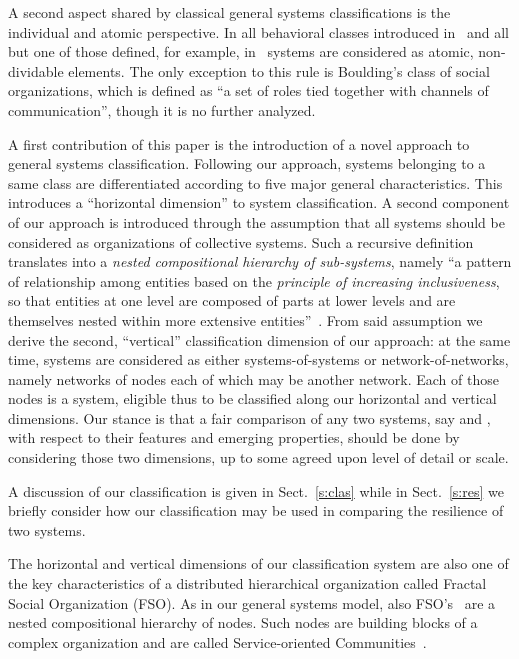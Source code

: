 \documentclass[twocolumn]{svjour3}
\begin{document}
A second aspect shared by classical general systems classifications is the individual
and atomic perspective. In all behavioral classes introduced in~\cite{RWB43} and all
but one of those defined, for example, in~\cite{Bou56} systems are
considered as atomic, non-dividable elements.
The only exception to this rule is Boulding's class of social organizations, which is defined
as ``a set of roles  tied together with channels of communication'', though it is no further
analyzed.

A first contribution of this paper is the introduction
of a novel approach to general systems classification.
Following our approach, systems belonging to a same class are
differentiated according to five major general characteristics.
This introduces a ``horizontal dimension'' to system classification.
A second component of our approach is introduced through the assumption
that all systems should be considered as organizations of collective systems.
Such a recursive definition translates into a \emph{nested compositional hierarchy of sub-systems}, namely
``a pattern of relationship among entities based on the \emph{principle of increasing inclusiveness},
so that entities at one level are composed of parts at lower levels and are themselves nested
within more extensive entities''~\cite{HT:TE14a}. From said assumption we derive
the second,
``vertical'' classification dimension of our approach:
at the same time, systems are considered as either systems-of-systems or network-of-networks,
namely networks of nodes each of which may be another network.
Each of those nodes is a system, eligible thus to be classified along our horizontal
and vertical dimensions. Our stance is that a fair comparison of any two systems,
say  and , with respect to their features and emerging properties, should
be done by considering those two dimensions, up to some agreed upon level of detail or scale.

A discussion of our classification is
given in Sect.~\ref{s:clas} while in Sect.~\ref{s:res} we briefly consider how
our classification may be used in comparing the resilience of two systems.







The horizontal and vertical dimensions of our classification system are also one of the key
characteristics of a distributed hierarchical organization called Fractal Social Organization (FSO).
As in our general systems model, also FSO's~\cite{DF13c,DeFPa15a,DF15a} are a nested compositional
hierarchy of nodes. Such nodes are building blocks of a complex organization and are
called Service-oriented Communities~\cite{DeBl10,DFCBD12}.
\end{document}
